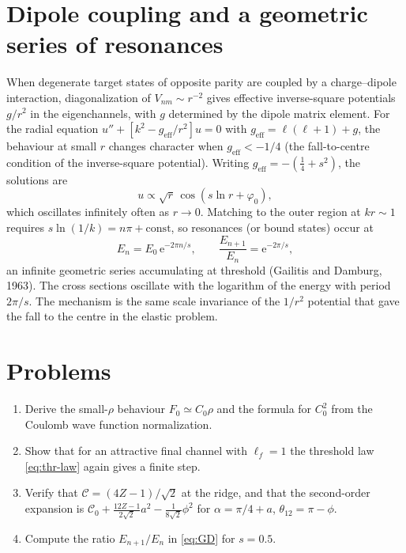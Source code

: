 \documentclass[11pt,a4paper]{book}
\numberwithin{equation}{chapter}
\newcommand{\ee}{\mathrm{e}}
\begin{document}
\section{Dipole coupling and a geometric series of resonances}\label{sec:GD}

When degenerate target states of opposite parity are coupled by a charge--dipole
interaction, diagonalization of $V_{nm}\sim r^{-2}$ gives effective
inverse-square potentials $g/r^2$ in the eigenchannels, with $g$ determined by the
dipole matrix element. For the radial equation $u''+[k^2-g_{\mathrm{eff}}/r^2]u=0$
with $g_{\mathrm{eff}}=\ell(\ell+1)+g$, the behaviour at small $r$ changes
character when $g_{\mathrm{eff}}<-1/4$ (the fall-to-centre condition of the
inverse-square potential). Writing $g_{\mathrm{eff}}=-(\tfrac14+s^2)$, the
solutions are
\begin{equation}\label{eq:logperiodic}
  u\propto\sqrt r\,\cos(s\ln r+\varphi_0),
\end{equation}
which oscillates infinitely often as $r\to0$. Matching to the outer region at
$kr\sim1$ requires $s\ln(1/k)=n\pi+\text{const}$, so resonances (or bound states)
occur at
\begin{equation}\label{eq:GD}
  E_n=E_0\,\ee^{-2\pi n/s},\qquad\frac{E_{n+1}}{E_n}=\ee^{-2\pi/s},
\end{equation}
an infinite geometric series accumulating at threshold (Gailitis and Damburg,
1963). The cross sections oscillate with the logarithm of the energy with period
$2\pi/s$. The mechanism is the same scale invariance of the $1/r^2$ potential
that gave the fall to the centre in the elastic problem.

\section{Problems}
\begin{enumerate}
  \item Derive the small-$\rho$ behaviour $F_0\simeq C_0\rho$ and the formula for
        $C_0^2$ from the Coulomb wave function normalization.
  \item Show that for an attractive final channel with $\ell_f=1$ the threshold
        law \eqref{eq:thr-law} again gives a finite step.
  \item Verify that $\mathcal C=(4Z-1)/\sqrt2$ at the ridge, and that the
        second-order expansion is $\mathcal C_0+\frac{12Z-1}{2\sqrt2}a^2-\frac{1}{8\sqrt2}\phi^2$
        for $\alpha=\pi/4+a$, $\theta_{12}=\pi-\phi$.
  \item Compute the ratio $E_{n+1}/E_n$ in \eqref{eq:GD} for $s=0.5$.
\end{enumerate}
\end{document}
